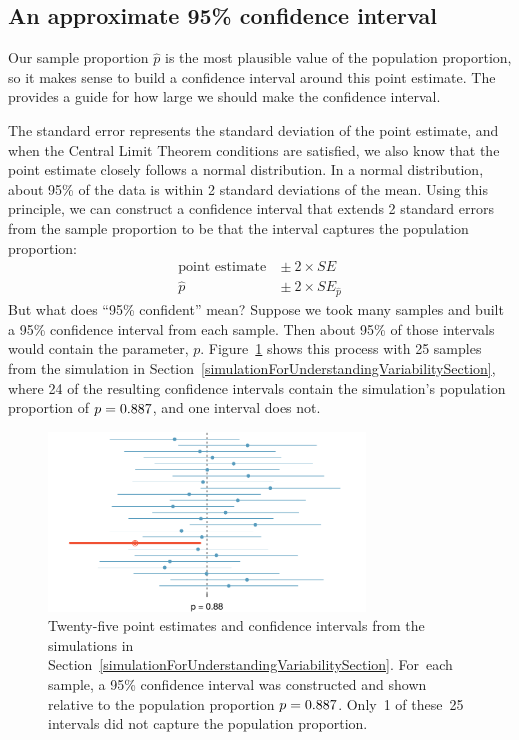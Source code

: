 \subsection{An approximate 95\% confidence interval}

Our sample proportion $\hat{p}$ is the most plausible
value of the population proportion, so it makes sense
to build a confidence interval around this point estimate.
The  provides a guide for how
large we should make the confidence interval.

The standard error represents the standard deviation
of the point estimate, and when the Central
Limit Theorem conditions are satisfied, we also know
that the point estimate closely follows a normal
distribution. In a normal distribution, about 95\% of
the data is within 2 standard deviations of the mean.
Using this principle, we can construct a confidence
interval that extends 2 standard errors from the sample
proportion to be 
that the interval captures the population proportion:
\begin{align*}
\text{point estimate}\ &\pm\ 2\times SE \\
\hat{p}\ &\pm\ 2\times SE_{\hat{p}}
\end{align*}
But what does ``95\% confident'' mean? Suppose we took
many samples and built a 95\% confidence interval from
each sample. Then about 95\% of those intervals would
contain the parameter, $p$.
Figure~\ref{95PercentConfidenceInterval} shows this
process with 25 samples from the simulation in
Section~\ref{simulationForUnderstandingVariabilitySection},
where 24 of the resulting confidence intervals contain
the simulation's population proportion of
$p = 0.887{}$, and one interval does not.

\begin{figure}
   \centering
   \includegraphics[width=0.75\textwidth]{ch_foundations_for_inf/figures/95PercentConfidenceInterval/95PercentConfidenceInterval}
   \caption{Twenty-five point estimates and confidence
       intervals from the simulations in
       Section~\ref{simulationForUnderstandingVariabilitySection}.
       For~each sample, a 95\% confidence interval was
       constructed and shown relative to the population
       proportion $p = 0.887{}$. Only~1 of these~25
       intervals did not capture the population
       proportion.}
   \label{95PercentConfidenceInterval}
\end{figure}

